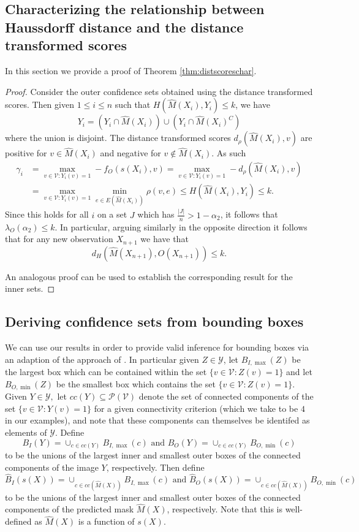 \subsection{Characterizing the relationship between Haussdorff distance and the distance transformed scores}\label{haussproof}
In this section we provide a proof of Theorem \ref{thm:distscoreschar}.
\begin{proof}
	Consider the outer confidence sets obtained using the distance transformed scores. Then given $1 \leq i \leq n$ such that $H(\hat{M}(X_i), Y_i) \leq k $, we have 
	$$Y_i = \left( Y_i \cap \hat{M}(X_i) \right)\cup \left( Y_i \cap \hat{M}(X_i)^C\right)$$
	where the union is disjoint. The distance transformed scores $d_\rho(\hat{M}(X_i), v)$ are positive for $v \in \hat{M}(X_i)$ and negative for $v \not \in \hat{M}(X_i)$. As such 
	\begin{align*}
		\gamma_i &= \max_{v \in \mathcal{V}: Y_i(v) = 1} -f_O(s(X_i), v) = \max_{v \in \mathcal{V}: Y_i(v) = 1} -d_\rho(\hat{M}(X_i), v)\\
		&= \max_{v \in \mathcal{V}: Y_i(v) = 1} \min_{e \in E(\hat{M}(X_i))} \rho(v, e) \leq H(\hat{M}(X_i), Y_i)  \leq k.
	\end{align*}
	Since this holds for all $i $ on a set $J$ which has  $\frac{|J|}{n} > 1-\alpha_2$, it follows that $\lambda_O(\alpha_2) \leq k $. In particular, arguing similarly in the opposite direction it follows that for any new observation $X_{n+1}$ we have that $$d_H(\hat{M}(X_{n+1}), O(X_{n+1}))  \leq k.$$ 
	
	An analogous proof can be used to establish the corresponding result for the inner sets. 
\end{proof}

\subsection{Deriving confidence sets from bounding boxes}\label{AA:BBtheory}
We can use our results in order to provide valid inference for bounding boxes via an adaption of the approach of \cite{Andeol2023}. In particular given $Z \in \mathcal{Y}$, let $B_{I, \max}(Z)$ be the largest box which can be contained within the set $\lbrace v\in \mathcal{V}: Z(v) = 1 \rbrace$ and let $ B_{O, \min}(Z)$ be the smallest box which contains the set $\lbrace v\in \mathcal{V}: Z(v) = 1 \rbrace$. Given $Y \in \mathcal{Y}, $ let $cc(Y) \subseteq \mathcal{P}(\mathcal{V})$ denote the set of connected components of the set $\lbrace v\in \mathcal{V}: Y(v) = 1 \rbrace$ for a given connectivity criterion (which we take to be $4$ in our examples), and note that these components can themselves be identifed as elements of $\mathcal{Y}$. Define 
$$B_I(Y) = \cup_{c \in cc(Y)} B_{I, \max}(c) \text{ and } B_O(Y) = \cup_{c \in cc(Y)} B_{O, \min}(c)$$
to be the unions of the largest inner and smallest outer boxes of the connected components of the image $Y$, respectively. Then define
$$\hat{B}_I(s(X)) = \cup_{c \in cc(\hat{M}(X)) } B_{I, \max}(c) \text{ and } \hat{B}_O(s(X)) = \cup_{c \in cc(\hat{M}(X))} B_{O, \min}(c)$$
to be the unions of the largest inner and smallest outer boxes of the connected components of the predicted mask $\hat{M}(X)$, respectively. Note that this is well-defined as $\hat{M}(X)$ is a function of $s(X)$.

